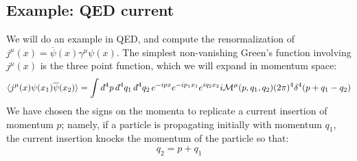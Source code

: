 \documentclass[11pt, oneside]{article}   	%
\theoremstyle{definition}
\newcommand{\dbar}{d\hspace*{-0.08em}\bar{}\hspace*{0.1em}}
\begin{document}
\subsection{Example: QED current}

We will do an example in QED, and compute the renormalization of $j^\mu(x) = \overline \psi(x)\gamma^\mu \psi(x)$. 
The simplest non-vanishing Green's function involving $j^\mu(x)$ is the three point function, which we will expand 
in momentum space:
\begin{equation}
	\langle j^\mu(x) \psi(x_1) \overline\psi(x_2)\rangle = \int \dbar^4 p\,\dbar^4 q_1\,\dbar^4 q_2\, e^{-ipx}e^{-ip_1 x_1}
	e^{iq_2x_2} i\mathcal M^\mu(p, q_1, q_2) (2\pi)^4 \delta^4(p + q_1 - q_2)
\end{equation}
We have chosen the signs on the momenta to replicate a current insertion of momentum $p$; namely, if a particle is 
propagating initially with momentum $q_1$, the current insertion knocks the momentum of the particle so that:
\begin{equation}
	q_2 = p + q_1
\end{equation}
\end{document}
